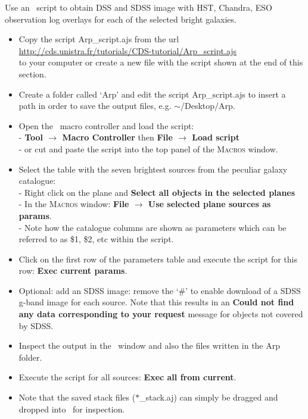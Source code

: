 \documentclass [a4paper, 12pt]{article}
\begin{document}
Use an \aladin\ script to obtain DSS and SDSS image with HST, Chandra, ESO
observation log overlays for each of the selected bright galaxies.
\renewcommand\UrlFont{\color{blue}\rmfamily}
\begin{itemize}
    \item Copy the script Arp\_script.ajs from the url \\
    \url{http://cds.unistra.fr/tutorials/CDS-tutorial/Arp_script.ajs} \\
     to your computer or create a new file with the script shown at the end
    of this section.
    \item Create a folder called `Arp' and edit the script Arp\_script.ajs to
    insert a path in order to save the output files, e.g. $\sim$/Desktop/Arp.
    \item Open the \aladin\ macro controller and load the script:\\
    - \textbf{Tool $\rightarrow$ Macro Controller} then \textbf{File
    $\rightarrow$ Load script}\\
    - or cut and paste the script into the top panel of the \textsc{Macros}
    window.
    \item Select the table with the seven brightest sources from the peculiar
    galaxy catalogue:\\
    - Right click on the plane and \textbf{Select all objects in the selected
    planes}\\
    - In the \textsc{Macros} window: \textbf{File $\rightarrow$ Use selected
    plane sources as params}.\\
    - Note how the catalogue columns are shown as parameters which can be
    referred to as \$1, \$2, etc within the script.
    \item Click on the first row of the parameters table and execute the script
    for this row: \textbf{Exec current params}.
    \item Optional: add an SDSS image: remove the `\#' to enable download of a
    SDSS g-band image for each source. Note that this results in an
    \textbf{Could not find any data corresponding to your request} message for
    objects not covered by SDSS.
    \item Inspect the output in the \aladin\ window and also the files written
    in the Arp folder.
    \item Execute the script for all sources: \textbf{Exec all from current}.
    \item Note that the saved stack files ($\ast$\_stack.aj) can simply be dragged and dropped
    into \aladin\ for inspection.
\end{itemize}
\end{document}
